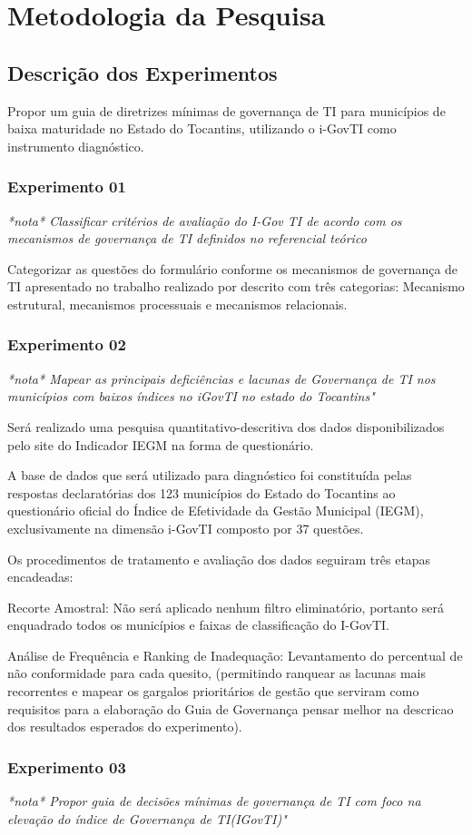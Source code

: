 
\mainmatter
\chapter{Metodologia da Pesquisa}\label{metodologia}

\section{Descrição dos Experimentos}
Propor um guia de diretrizes mínimas de governança de TI para municípios de baixa maturidade no 
Estado do Tocantins, utilizando o i-GovTI como instrumento diagnóstico. 

\subsection{Experimento 01}
\textit{*nota* Classificar critérios de avaliação do 
I-Gov TI de acordo com os mecanismos de governança de TI 
definidos no referencial teórico}

Categorizar as questões do formulário conforme os mecanismos de governança de TI apresentado no
trabalho realizado por \cite{sengik_governanctecnologia_2022} descrito com três
categorias: Mecanismo estrutural, mecanismos processuais e mecanismos relacionais.


\subsection{Experimento 02}
\textit{*nota* Mapear as principais deficiências e lacunas de Governança de TI nos municípios com 
baixos índices no iGovTI no estado do Tocantins"}

Será realizado uma pesquisa quantitativo-descritiva dos dados disponibilizados pelo site do 
Indicador IEGM na forma de questionário. 

A base de dados que será utilizado para diagnóstico foi constituída pelas respostas declaratórias 
dos 123 municípios do Estado do Tocantins ao questionário oficial do Índice de Efetividade da Gestão 
Municipal (IEGM), exclusivamente na dimensão i-GovTI composto por 37 questões.

Os procedimentos de tratamento e avaliação dos dados seguiram três etapas encadeadas:

Recorte Amostral: Não será aplicado nenhum filtro eliminatório, portanto será enquadrado 
todos os municípios e faixas de classificação do I-GovTI.

Análise de Frequência e Ranking de Inadequação: Levantamento do percentual de não conformidade para 
cada quesito, (permitindo ranquear as lacunas mais recorrentes e mapear os gargalos prioritários de 
gestão que serviram como requisitos para a elaboração do Guia de Governança {pensar melhor na
descricao dos resultados esperados do experimento}).

\subsection{Experimento 03}
\textit{*nota* Propor guia de decisões mínimas de governança de TI  com foco na elevação do índice 
de Governança de TI(IGovTI)"}